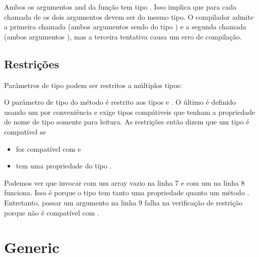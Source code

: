 
Ambos os argumentos  and  da função  tem tipo . Isso implica que para cada chamada de   os dois argumentos devem ser do mesmo tipo. O compilador admite a primeira chamada (ambos argumentos sendo do tipo ) e a segunda chamada (ambos argumentos ), mas a terceira tentativa causa um erro de compilação.


\subsection{Restrições}
\label{type-system-type-parameter-constraints}

Parâmetros de tipo podem ser restritos a múltiplos tipos:

O parâmetro de tipo  do método  é restrito aos tipos  e . O último é definido usando um  por conveniência e exige tipos compátiveis que tenham a propriedade  de nome  de tipo  somente para leitura. As restrições então dizem que um tipo é compatível se

\begin{itemize}
	\item for compatível com   e
	\item tem uma propriedade  do tipo .
\end{itemize}
Podemos ver que invocar  com um array vazio na linha 7 e com um  na linha 8 funciona. Isso é porque o tipo  tem tanto uma propriedade  quanto um método . Entretanto, passar um argumento  na linha 9 falha na verificação de restrição porque  não é compatível com . 


\section{Generic}
\label{type-system-generic}

